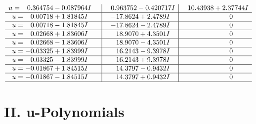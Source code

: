 \documentclass[1p]{elsarticle_modified}
\theoremstyle{definition}
\begin{document}
$$\begin{array}{c|c|c}
\begin{aligned}
u &= \phantom{-}0.364754 - 0.087964 I\end{aligned}
 & \phantom{-}0.963752 - 0.420717 I & \phantom{-}10.43938 + 2.37744 I \\ \hline\begin{aligned}
u &= \phantom{-}0.00718 + 1.81845 I\end{aligned}
 & -17.8624 + 2.4789 I & \phantom{-0.000000 } 0 \\ \hline\begin{aligned}
u &= \phantom{-}0.00718 - 1.81845 I\end{aligned}
 & -17.8624 - 2.4789 I & \phantom{-0.000000 } 0 \\ \hline\begin{aligned}
u &= \phantom{-}0.02668 + 1.83606 I\end{aligned}
 & \phantom{-}18.9070 + 4.3501 I & \phantom{-0.000000 } 0 \\ \hline\begin{aligned}
u &= \phantom{-}0.02668 - 1.83606 I\end{aligned}
 & \phantom{-}18.9070 - 4.3501 I & \phantom{-0.000000 } 0 \\ \hline\begin{aligned}
u &= -0.03325 + 1.83999 I\end{aligned}
 & \phantom{-}16.2143 - 9.3978 I & \phantom{-0.000000 } 0 \\ \hline\begin{aligned}
u &= -0.03325 - 1.83999 I\end{aligned}
 & \phantom{-}16.2143 + 9.3978 I & \phantom{-0.000000 } 0 \\ \hline\begin{aligned}
u &= -0.01867 + 1.84515 I\end{aligned}
 & \phantom{-}14.3797 - 0.9432 I & \phantom{-0.000000 } 0 \\ \hline\begin{aligned}
u &= -0.01867 - 1.84515 I\end{aligned}
 & \phantom{-}14.3797 + 0.9432 I & \phantom{-0.000000 } 0\\
 \hline 
 \end{array}$$\newpage
\newpage\renewcommand{\arraystretch}{1}
\centering \section*{ II. u-Polynomials}
\end{document}

